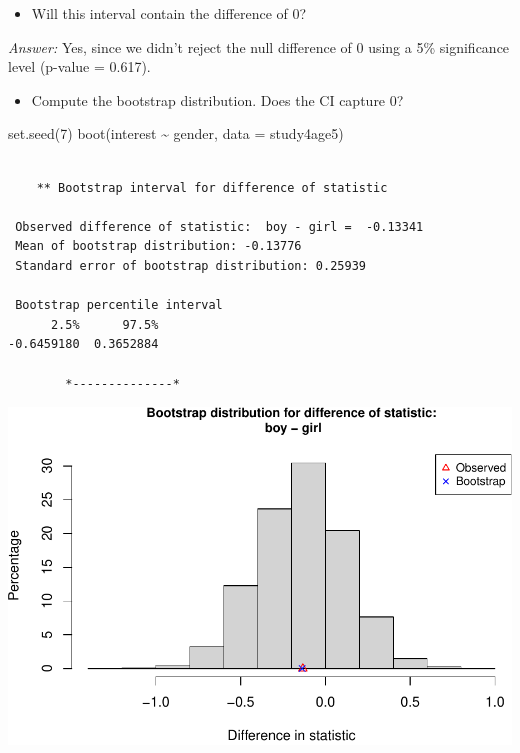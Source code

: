 \documentclass[
]{book}
\newenvironment{Shaded}{\begin{snugshade}}{\end{snugshade}}
\newcommand{\AttributeTok}[1]{\textcolor[rgb]{0.77,0.63,0.00}{#1}}
\newcommand{\DecValTok}[1]{\textcolor[rgb]{0.00,0.00,0.81}{#1}}
\newcommand{\FunctionTok}[1]{\textcolor[rgb]{0.00,0.00,0.00}{#1}}
\newcommand{\NormalTok}[1]{#1}
\newcommand{\SpecialCharTok}[1]{\textcolor[rgb]{0.00,0.00,0.00}{#1}}
\providecommand{\tightlist}{%
  \setlength{\itemsep}{0pt}\setlength{\parskip}{0pt}}
\begin{document}
\begin{itemize}
\tightlist
\item
  Will this interval contain the difference of 0?
\end{itemize}

\emph{Answer:} Yes, since we didn't reject the null difference of 0 using a 5\% significance level (p-value = 0.617).

\begin{itemize}
\tightlist
\item
  Compute the bootstrap distribution. Does the CI capture 0?
\end{itemize}

\begin{Shaded}
\begin{Highlighting}[]
\FunctionTok{set.seed}\NormalTok{(}\DecValTok{7}\NormalTok{)}
\FunctionTok{boot}\NormalTok{(interest }\SpecialCharTok{\textasciitilde{}}\NormalTok{ gender, }\AttributeTok{data =}\NormalTok{ study4age5)}
\end{Highlighting}
\end{Shaded}

\begin{verbatim}

    ** Bootstrap interval for difference of statistic

 Observed difference of statistic:  boy - girl =  -0.13341 
 Mean of bootstrap distribution: -0.13776 
 Standard error of bootstrap distribution: 0.25939 

 Bootstrap percentile interval
      2.5%      97.5% 
-0.6459180  0.3652884 

        *--------------*
\end{verbatim}

\includegraphics[width=1\linewidth]{Class_Activity_14_files/figure-latex/unnamed-chunk-5-1}
\end{document}
